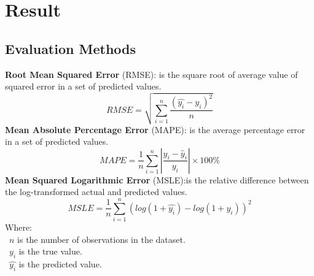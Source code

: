 \documentclass{ieeeojies}
\begin{document}
\section{Result}
\subsection{Evaluation Methods}
\textbf{Root Mean Squared Error} (RMSE): is the square root of average value of squared error in a set of predicted values.
\[RMSE=\sqrt{\sum_{i=1}^{n} \frac{(\hat{y_i}-y_i )^2}{n} }\]
\textbf{Mean Absolute Percentage Error} (MAPE): is the average percentage error in a set of predicted values.
\[MAPE = \frac{1}{n} \sum_{i=1}^{n} \left| \frac{y_i - \hat{y}_i}{y_i} \right| \times 100\%\]
\textbf{Mean Squared Logarithmic Error} (MSLE):is the relative difference between the log-transformed actual and predicted values.\\
\[MSLE=\frac{1}{n}\sum_{i=1}^{n}(log(1+\hat{y_i})-log(1+y_i))^2\]
Where: \\
	\indent\textbullet\ \(n\) is the number of observations in the dataset.\\
	\indent\textbullet\ \(y_i\)  is the true value.\\
	\indent\textbullet\ \(\hat{y_i}\) is the predicted value.
\end{document}
